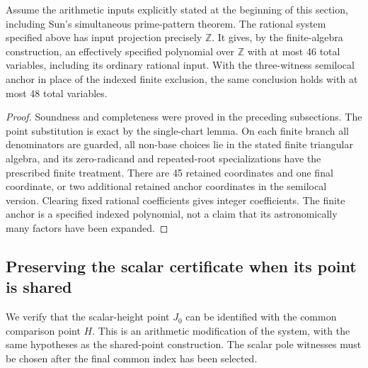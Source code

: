 \begin{theorem}
Assume the arithmetic inputs explicitly stated at the beginning of
this section, including Sun's simultaneous prime-pattern theorem.
The rational system specified above has input projection precisely
$\mathbb Z$. It gives, by the finite-algebra construction, an
effectively specified polynomial over $\mathbb Z$ with at most
46 total variables, including its ordinary rational input. With the
three-witness semilocal anchor in place of the indexed finite exclusion,
the same conclusion holds with at most 48 total variables.
\end{theorem}
\begin{proof}
Soundness and completeness were proved in the preceding subsections.
The point substitution is exact by the single-chart lemma. On each
finite branch all denominators are guarded, all non-base choices lie
in the stated finite triangular algebra, and its zero-radicand and
repeated-root specializations have the prescribed finite treatment.
There are 45 retained coordinates and one final coordinate, or two
additional retained anchor coordinates in the semilocal version.
Clearing fixed rational coefficients gives integer coefficients.
The finite anchor is a specified indexed polynomial, not a claim that
its astronomically many factors have been expanded.
\end{proof}

\subsection{Preserving the scalar certificate when its point is shared}
\label{subsec:independent-height-sharing}

We verify that the scalar-height point $J_0$ can be identified with the
common comparison point $H$.  This is an arithmetic modification of the
system, with the same hypotheses as the shared-point construction.  The
scalar pole witnesses must be chosen after the final common index has
been selected.

